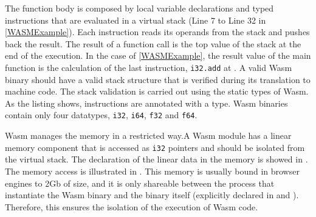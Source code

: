 The function body is composed by local variable declarations and typed instructions that are evaluated in a virtual stack (Line 7 to Line 32 in \autoref{WASMExample}). Each instruction reads its operands from the stack and pushes back the result. The result of a function call is the top value of the stack at the end of the execution. In the case of \autoref{WASMExample}, the result value of the main function is the calculation of the last instruction, \texttt{i32.add} at . A valid Wasm binary should have a valid stack structure that is verified during its translation to machine code. The stack validation is carried out using the static types of Wasm. 
As the listing shows, instructions are annotated with a type. Wasm binaries contain only four datatypes, \texttt{i32}, \texttt{i64}, \texttt{f32} and \texttt{f64}.

\begin{code}
    \begin{minipage}[t]{0.4\linewidth}

\end{minipage}\hspace{20mm}
\begin{minipage}[t]{0.4\linewidth}

%

\end{minipage}






\end{code}

Wasm manages the memory in a restricted way.A Wasm module has a linear memory component that is accessed as \texttt{i32} pointers and should be isolated from the virtual stack. The declaration of the linear data in the memory is showed in . The memory access is illustrated in . This memory is usually bound in browser engines to 2Gb of size, and it is only shareable between the process that instantiate the Wasm binary and the binary itself (explicitly declared in  and ). Therefore, this ensures the isolation of the execution of Wasm code. 

